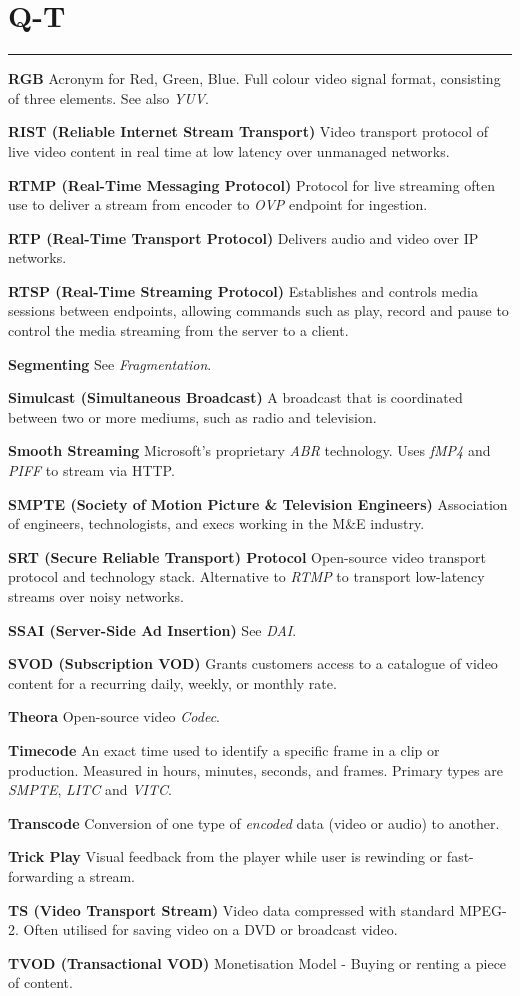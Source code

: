 \section{Q-T}
\hrule

\medskip
\textbf{RGB}
Acronym for Red, Green, Blue. Full colour video signal format, consisting of three elements. See also \textit{YUV}.

\smallskip
\textbf{RIST (Reliable Internet Stream Transport)}
Video transport protocol of live video content in real time at low latency over unmanaged networks.

\smallskip
\textbf{RTMP (Real-Time Messaging Protocol)}
Protocol for live streaming often use to deliver a stream from encoder to \textit{OVP} endpoint for ingestion.

\smallskip
\textbf{RTP (Real-Time Transport Protocol)}
Delivers audio and video over IP networks.

\smallskip
\textbf{RTSP (Real-Time Streaming Protocol)}
Establishes and controls media sessions between endpoints, allowing commands such as play, record and pause to control the media streaming from the server to a client.

\smallskip
\textbf{Segmenting}
See \textit{Fragmentation}.

\smallskip
\textbf{Simulcast (Simultaneous Broadcast)}
A broadcast that is coordinated between two or more mediums, such as radio and television.

\smallskip
\textbf{Smooth Streaming}
Microsoft’s proprietary \textit{ABR} technology. Uses \textit{fMP4} and \textit{PIFF} to stream via HTTP.

\smallskip
\textbf{SMPTE (Society of Motion Picture \& Television Engineers)}
Association of engineers, technologists, and execs working in the M\&E industry.

\smallskip
\textbf{SRT (Secure Reliable Transport) Protocol}
Open-source video transport protocol and technology stack. Alternative to \textit{RTMP} to transport low-latency streams over noisy networks.

\smallskip
\textbf{SSAI (Server-Side Ad Insertion)}
See \textit{DAI}.

\smallskip
\textbf{SVOD (Subscription VOD)}
Grants customers access to a catalogue of video content for a recurring daily, weekly, or monthly rate.

\smallskip
\textbf{Theora}
Open-source video \textit{Codec}.

\smallskip
\textbf{Timecode}
An exact time used to identify a specific frame in a clip or production. Measured in hours, minutes, seconds, and frames. Primary types are \textit{SMPTE}, \textit{LITC} and \textit{VITC}.

\smallskip
\textbf{Transcode}
Conversion of one type of \textit{encoded} data (video or audio) to another.

\smallskip
\textbf{Trick Play}
Visual feedback from the player while user is rewinding or fast-forwarding a stream.

\smallskip
\textbf{TS (Video Transport Stream)}
Video data compressed with standard MPEG-2. Often utilised for saving video on a DVD or broadcast video.

\smallskip
\textbf{TVOD (Transactional VOD)}
Monetisation Model - Buying or renting a piece of content.
